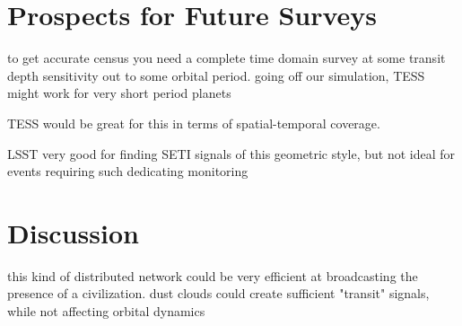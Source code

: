 \documentclass[modern]{aastex62}
\begin{document}
%
%
%
%
%
%
%
%



\section{Prospects for Future Surveys}

to get accurate census you need a complete time domain survey at some transit depth sensitivity out to some orbital period. going off our simulation, TESS might work for very short period planets

TESS would be great for this in terms of spatial-temporal coverage. 

LSST very good for finding SETI signals of this geometric style, but not ideal for events requiring such dedicating monitoring


\section{Discussion}
this kind of distributed network could be very efficient at broadcasting the presence of a civilization. dust clouds could create sufficient "transit" signals, while not affecting orbital dynamics
\end{document}

